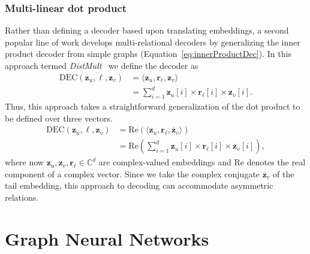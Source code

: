 \subsubsection{Multi-linear dot product}
Rather than defining a decoder based upon translating embeddings, a second popular line of work develops multi-relational decoders by generalizing the inner product decoder from simple graphs (Equation~\ref{eq:innerProductDec}). In this approach termed \textit{DistMult}~\cite{Yang2014DistMult} we define the decoder as
\begin{align*}
    \text{DEC}(\mathbf{z}_u, \ell, \mathbf{z}_v) &= \langle\mathbf{z}_u, \mathbf{r}_\ell, \mathbf{z}_v\rangle\\
    &= \sum_{i=1}^d \mathbf{z}_u[i] \times \mathbf{r}_\ell[i] \times \mathbf{z}_v[i].
\end{align*}
Thus, this approach takes a straightforward generalization of the dot product to be defined over three vectors.
\begin{align*}
\text{DEC}(\mathbf{z}_u, \ell, \mathbf{z}_v) &= \text{Re}(\langle \mathbf{z}_u, \mathbf{r}_\ell, \overline{\mathbf{z}}_v\rangle)\\
&= \text{Re}(\sum_{i=1}^d \mathbf{z}_u[i] \times \mathbf{r}_\ell[i] \times \overline{\mathbf{z}}_v[i]),
\end{align*}
where now $\mathbf{z}_u, \mathbf{z}_v, \mathbf{r}_\ell \in \mathbb{C}^d$ are complex-valued embeddings and $\text{Re}$ denotes the real component of a complex vector. Since we take the complex conjugate $\overline{\mathbf{z}}_v$ of the tail embedding, this approach to decoding can accommodate asymmetric relations.

\section{Graph Neural Networks}\label{sec:gnn}

